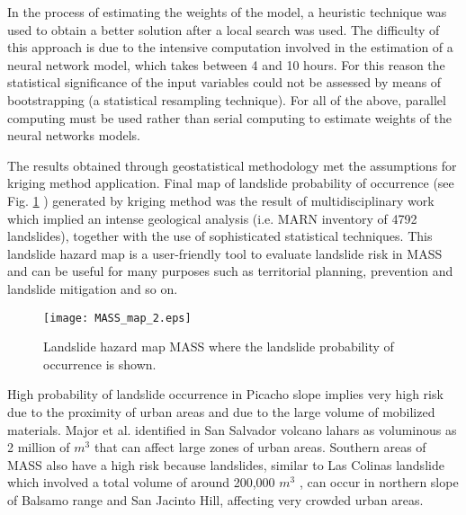 \documentclass[11pt,twoside]{rmta2010eng}%
\begin{document}
In the process of estimating the weights of the model, a heuristic technique was used to obtain a better solution after a local search was used. The difficulty of this approach is due to the intensive computation involved in the estimation of a neural network model, which takes between 4 and 10 hours. For this reason the statistical significance of the input variables could not be assessed by means of bootstrapping (a statistical resampling technique). For all of the above, parallel computing must be used rather than serial computing to estimate weights of the neural networks models.



The results obtained through geostatistical methodology met the assumptions for kriging method application. Final map of landslide probability of occurrence (see Fig. \ref{fig:mass02} ) generated by kriging method was the result of multidisciplinary work which implied an intense geological analysis (i.e. MARN inventory of 4792 landslides), together with the use of sophisticated statistical techniques. This landslide hazard map is a user-friendly tool to evaluate landslide risk in MASS and can be useful for many purposes such as territorial planning, prevention and landslide mitigation and so on. 
\begin{center}
  \begin{figure}
   \centering
   \texttt{[image: MASS\_map\_2.eps]}
   \caption{\small{Landslide hazard map MASS where the landslide probability of occurrence is shown.}}
   \label{fig:mass02}
  \end{figure}
 \end{center}
High probability of landslide occurrence in Picacho slope implies very high risk due to the proximity of urban areas and due to the large volume of mobilized materials. Major et al.\cite{major2004} identified in San Salvador volcano lahars as voluminous as 2 million of $m^{3}$ that can affect large zones of urban areas. Southern areas of MASS also have a high risk because landslides, similar to Las Colinas landslide which involved a total volume of around 200,000 $m^{3}$ \cite{evans}, can occur in northern slope of Balsamo range and San Jacinto Hill, affecting very crowded urban areas.
\end{document}
